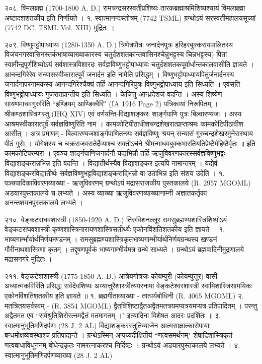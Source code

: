 २०८. विमलब्रह्म (1700-1800 A. D.)
रामचन्द्रसरस्वतीप्रशिष्यः तारकब्रह्माश्रमिशिष्यश्चायं विमलब्रह्मा अष्टादशशतकीय इति निर्णीयते । 
१. स्वात्मानन्दस्तोत्रम् (7742 TSML) ग्रन्थोऽयं सरस्वतीमहालयसूच्यां (7742 DC. TSML Vol. XIII) मुद्रितः ।

२०९. विष्णुमट्टोपाध्यायः (1280-1350 A. D.)
त्रिणेत्रपौत्रः जनार्दनपुत्रः हरिहरबुक्करायपालितस्य विजयनगरवासिनस्तर्कभाषाव्याख्याकारस्य चतुर्दशशतकान्तवासिनश्चेन्नुभट्टस्य चिन्नभट्टस्य) पिता स्वामीन्द्रपूर्णशिष्योऽयं सर्वशास्त्रविशारदः सर्वज्ञविष्णुभट्टोपाध्यायः चतुर्दशशतकपूर्वार्धान्तकालवासीति ज्ञायते । आनन्दगिरेरेव सन्यासस्वीकारात्पूर्वं जनार्दन इति नामेति प्रसिद्धम् । विष्णुभट्टोपाध्यायपितुर्जनार्दनस्य जनार्दनापरनामकस्य आनन्दगिरेश्चैक्यं तर्हि आनन्दगिरिपुत्रः विष्णुभट्टोपाध्याय इति सिध्यति । एवंसति विष्णुभट्टोपाध्यायः गुजरातप्रान्तीय इति सिध्यति । केचित्तु आन्ध्रदेशजं वदन्ति । अस्य शिष्येण सायणमाधवगुरुरिति ``इण्डियम् आण्डिक्वैरि" (IA 1916 Page 2) पत्रिकायां निरूपितम् ।
श्रीकण्ठशास्त्रिणस्तु (IHQ XIV) एवं वर्णयन्ति-विद्याशङ्करः शार्ङ्गपाणि पुत्रः बिल्वारण्यजः । अस्य आश्रमस्वीकारात्पूर्वं सर्वज्ञविष्णुरिति नाम । कामकोटिपीठाधीशचन्द्रशेखरात्प्राप्ताश्रमः कामकोटिपीठावीश आसीत् । अत्र प्रमाणम् -
बिल्वारण्यजशार्ङ्गपाणितनयः सर्वज्ञविष्णुः श्रयन्
सन्यासं गुरुचन्द्रशेखरमुनेरास्थाय पीठं गुरोः ।
योगेशस्य च चक्रराजवसतेर्देव्याश्च सक्तोऽर्चने
श्रीमन्माधवबुक्कभारतियतिप्रेष्टैर्महिष्ठैर्वृतः ॥ इति
कामकोटिपरम्परा । एवञ्च शार्ङ्गपाणिजनार्दनौ यद्यभिन्नौ तर्हि ऋजुविवरणकारस्सर्वज्ञविष्णुभट्टः विद्याशङ्करान्नभिन्न इति वदन्ति ।
विद्यातीर्थस्यैव विद्याशङ्कर इत्यपि नामान्तरम् । यद्येवं विद्याशङ्करविद्यातीर्थः सर्वज्ञविष्णुभट्टविद्याशङ्कराद्भिन्नो वा उताभिन्न इति संशय उदेति ।
१. पञ्चपादिकाविवरणव्याख्या - ऋजुविवरणम् ग्रन्थोऽयं मद्रासराजकीय पुस्तकालये (R. 2957 MGOML) अडयारपुस्तकालये च लभ्यते । अस्य व्याख्या ऋजुविवरणव्याख्यानाम्नी अज्ञातकर्तृका अनन्तशयनपुस्तकालये लभ्यते ।

२१०. वेङ्कटराघवशास्त्री (1850-1920 A. D.)
तिरुविशनल्लूर रामसुब्रह्मण्यशास्त्रिशिष्योऽयं वेङ्कटराघवशास्त्री कृष्णशास्त्रिनारायणशास्त्रिसतीर्थ्यः एकोनविंशतिशतकीय इति ज्ञायते ।
१. भाष्यगार्म्भार्यार्थनिर्णयमण्डनम् । रामसुब्रह्मण्यशास्त्रिकृतभाष्यगाम्भीर्यार्थनिर्णयग्रन्थस्य खण्डनं गौरीनाथशास्त्रिणा कृतम् । तद्दूषणपूर्वकं भाष्यगाम्भीर्यमत्र ग्रन्थे साध्यते । ग्रन्थोऽयं ब्रह्मवादिनीमुद्रणालये मद्रासनगरे मुद्रितः ।

२११. वेङ्कटेशशास्त्री (1775-1850 A. D.)
आत्रेयगोत्रजः कोयम्पुरी (कोयम्पुत्तूर) वासी अध्यात्मकविरिति प्रसिद्धः सर्वदेवशिष्यः अय्यात्तुरैशास्त्रीत्यपरनामा वेङ्कटेश्वरशास्त्री स्वामिशास्त्रिसामयिकः एकोनविंशतिशतकीय इति ज्ञायते ॥
१. ब्रह्मगीताव्याख्या - तात्पर्यबोधिनी (R. 4065 MGOML)
२. मतत्रितयसर्वस्वम् - (R. 3854 MGOML)
द्वैतविशिष्टाद्वैतअद्वैतमतत्रयमप्यत्रयमप्यत्र प्रतिपादितम् । परन्तु अद्वैतमत एव ``सर्वश्रुतिशिरोरत्नमद्वैतं मतमागतम् ।" इत्यादिना विशेषत आदरः प्रदर्शितः ॥
३. स्वात्मानुभूतिमणिदर्पणः (28 J. 2 AL)
विद्याशङ्करस्तुतिव्याजेन आत्मसाक्षात्कारोपायाः बन्धमोक्षव्यवस्थाश्च प्रतिपाद्यन्ते । ग्रन्थेऽस्मिन् अप्पय्यदीक्षितीयं ``णत्वसमर्थनम्" शेषाद्रिशास्त्रिकृतं णत्वबाधाविधूननम् बोधेन्द्रकृतः नामरत्नाकरश्च निर्दिष्टः । ग्रन्थोऽयं अडयारपुस्तकालये लभ्यते ।
४. स्वात्मानुभूतिमणिदर्पणव्याख्या (28 J. 2 AL)

